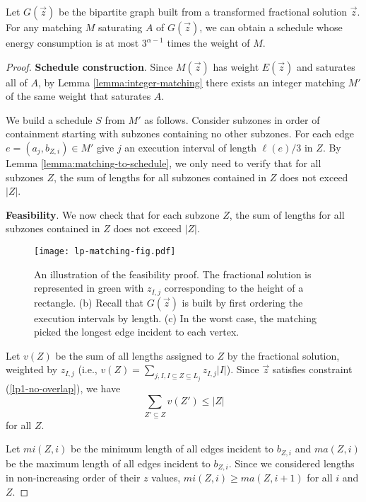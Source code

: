 \begin{lem}\label{lemma:matching-to-schedule}
  Let $G(\vec{z})$ be the bipartite graph built from a transformed fractional solution $\vec{z}$.
  For any matching $M$ saturating $A$ of $G(\vec{z})$, we can obtain a schedule whose energy consumption is at most $3^{\alpha-1}$ times the weight of $M$. \end{lem}
\begin{proof}

\textbf{Schedule construction}.
Since $M(\vec{z})$ has weight $E(\vec{z})$ and saturates all of $A$, by Lemma \ref{lemma:integer-matching} there exists an integer matching $M'$ of the same weight that saturates $A$.

We build a schedule $S$ from $M'$ as follows. Consider subzones in order of containment starting with subzones containing no other subzones. For each edge $e=(a_j, b_{Z,i}) \in M'$ give $j$ an execution interval of length $\ell(e)/3$ in $Z$. By Lemma \ref{lemma:matching-to-schedule}, we only need to verify that for all subzones $Z$, the sum of lengths for all subzones contained in $Z$ does not exceed $|Z|$.

\textbf{Feasibility}.
We now check that for each subzone $Z$, the sum of lengths for all subzones contained in $Z$ does not exceed $|Z|$.

\begin{figure}[ht!]
   \begin{center}
        \texttt{[image: lp-matching-fig.pdf]}
   \end{center}
   \caption{An illustration of the feasibility proof. The fractional solution is represented in green with $z_{I,j}$ corresponding to the height of a rectangle. (b) Recall that $G(\vec{z})$ is built by first ordering the execution intervals by length. (c) In the worst case, the matching picked the longest edge incident to each vertex.}
   \label{fig:LP_matching}
\end{figure}

Let $v(Z)$ be the sum of all lengths assigned to $Z$ by the fractional solution, weighted by $z_{I,j}$ (i.e., $v(Z) = \sum_{j, I, I \subseteq Z \subseteq L_j} z_{I,j} |I|$). Since $\vec{z}$ satisfies constraint (\ref{lp1-no-overlap}), we have
\[
\sum_{Z' \subseteq Z} v(Z') \le |Z|
\]
for all $Z$.



Let $mi(Z,i)$ be the minimum length of all edges incident to $b_{Z,i}$ and $ma(Z,i)$ be the maximum length of all edges incident to $b_{Z,i}$. Since we considered lengths in non-increasing order of their $z$ values, $mi(Z,i) \ge ma(Z,i+1)$ for all $i$ and $Z$.



\end{proof}
